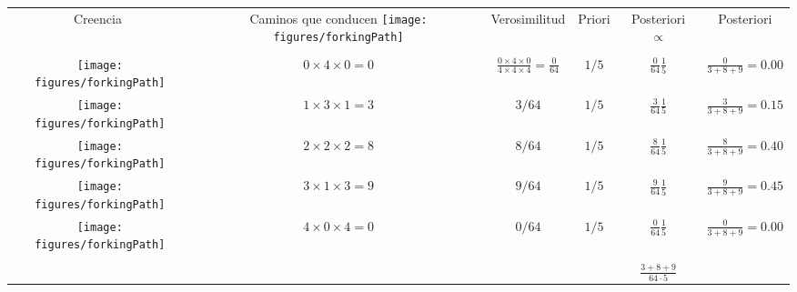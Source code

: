 \documentclass[a4paper,10pt,spanish]{article}
\begin{document}
  
 \begin{table}[H]
 \tiny 
\begin{tabular}{cccccc}
\ \ \ Creencia \ \ \ & Caminos que conducen   \texttt{[image: figures/forkingPath]}  
& Verosimilitud & Priori & Posteriori $\propto$ & Posteriori
\\ \cline{1-6} \\[-0.2cm]

  \texttt{[image: figures/forkingPath]} &  $0 \times 4 \times 0 = 0$ 
 & $\frac{0 \times 4 \times 0 }{4 \times 4 \times 4 } = \frac{0}{64} $  & $1/5$ & $\frac{0}{64}\frac{1}{5}$ & $\frac{0}{3+8+9} =  0.00 $ 
 \\[2pt]
  \texttt{[image: figures/forkingPath]} &  $1 \times 3 \times 1 = 3$ 
 &$ 3/64 $ & $1/5$ & $\frac{3}{64}\frac{1}{5}$&$\frac{3}{3+8+9} = 0.15$\\[2pt]
  \texttt{[image: figures/forkingPath]} &  $2 \times 2 \times 2 = 8$ &$8/64$&$1/5$ &$\frac{8}{64}\frac{1}{5}$ & $\frac{8}{3+8+9}=0.40$\\[2pt]
  \texttt{[image: figures/forkingPath]} &  $3 \times 1 \times 3 = 9$ &$9/64$&$1/5$ &$\frac{9}{64}\frac{1}{5}$&$\frac{9}{3+8+9}=0.45$\\[2pt]
  \texttt{[image: figures/forkingPath]} &  $4 \times 0 \times 4 = 0$ &$0/64$&$1/5$ &$\frac{0}{64}\frac{1}{5}$&$\frac{0}{3+8+9}=0.00$\\[2pt] \cline{5-5} \\[-0.2cm]
 & & & & $\frac{3 + 8 + 9 }{64 \cdot 5} $ & 
\end{tabular}
\end{table}
\end{document}
